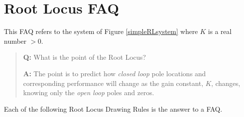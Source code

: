 




\section{Root Locus FAQ}

This FAQ refers to the system of Figure \ref{simpleRLsystem} where $K$ is a real
number $>0$.

\vspace{0.25in}
\begin{quotation}
{\bf Q:}  What is the point of the Root Locus?

{\bf A:}  The point is to predict how {\it closed loop} pole
locations  and  corresponding performance will change as the gain constant, $K$, changes,
knowing only the {\it open loop} poles and zeros.
\end{quotation}

\vspace{0.35in}	%



Each of the following Root Locus Drawing Rules is the answer to a FAQ.

